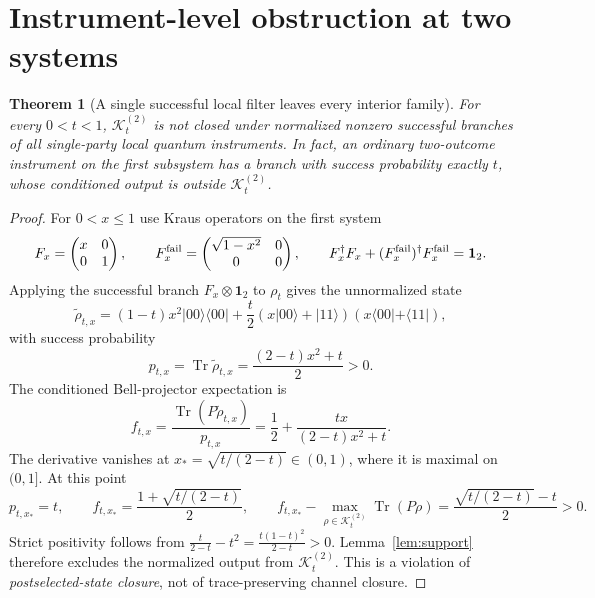 \documentclass[10pt,letterpaper]{article}
\newtheorem{theorem}{Theorem}
\newcommand{\KK}{\mathcal K}
\newcommand{\tr}{\operatorname{Tr}}
\newcommand{\id}{\mathbf 1}
\begin{document}
\section{Instrument-level obstruction at two systems}
\begin{theorem}[A single successful local filter leaves every interior family]
\label{thm:filter}
For every $0<t<1$, $\KK_t^{(2)}$ is not closed under normalized
nonzero successful branches of all single-party local quantum instruments.
In fact, an ordinary two-outcome instrument on the first subsystem has a branch
with success probability exactly $t$, whose conditioned output is outside
$\KK_t^{(2)}$.
\end{theorem}
\begin{proof}
For $0<x\le1$ use Kraus operators on the first system
\[
F_x=\begin{pmatrix}x&0\\0&1\end{pmatrix},\qquad
F_x^{\rm fail}=\begin{pmatrix}\sqrt{1-x^2}&0\\0&0\end{pmatrix},\qquad
F_x^\dagger F_x+(F_x^{\rm fail})^\dagger F_x^{\rm fail}=\id_2.
\]
Applying the successful branch $F_x\otimes\id_2$ to $\rho_t$ gives the
unnormalized state
\[
\widetilde\rho_{t,x}=(1-t)x^2|00\rangle\langle00|
+\frac t2(x|00\rangle+|11\rangle)(x\langle00|+\langle11|),
\]
with success probability
\begin{equation}\label{eq:success}
p_{t,x}=\tr\widetilde\rho_{t,x}=
\frac{(2-t)x^2+t}{2}>0.
\end{equation}
The conditioned Bell-projector expectation is
\begin{equation}\label{eq:fidelity}
f_{t,x}=\frac{\tr(P\widetilde\rho_{t,x})}{p_{t,x}}
=\frac12+\frac{tx}{(2-t)x^2+t}.
\end{equation}
The derivative vanishes at $x_*=\sqrt{t/(2-t)}\in(0,1)$,
where it is maximal on $(0,1]$. At this point
\begin{equation}\label{eq:gap}
p_{t,x_*}=t,\qquad
f_{t,x_*}=\frac{1+\sqrt{t/(2-t)}}{2},\qquad
f_{t,x_*}-\max_{\rho\in\KK_t^{(2)}}\tr(P\rho)
=\frac{\sqrt{t/(2-t)}-t}{2}>0.
\end{equation}
Strict positivity follows from
$\frac{t}{2-t}-t^2=\frac{t(1-t)^2}{2-t}>0$.
Lemma~\ref{lem:support} therefore excludes the normalized output from
$\KK_t^{(2)}$. This is a violation of \emph{postselected-state closure},
not of trace-preserving channel closure.\end{proof}
\end{document}
